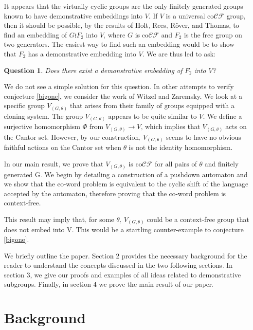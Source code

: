 \documentclass[11pt]{amsart}
\theoremstyle{plain}
\newtheorem{question}[theorem]{Question}
\theoremstyle{remark}
\theoremstyle{definition}
\theoremstyle{remark}
\theoremstyle{named}
\begin{document}
It appears that the virtually cyclic groups are the only finitely generated groups known to have demonstrative embeddings into $V$. If $V$ is a universal co$\mathcal{CF}$ group, then it should be possible, by the results of Holt, Rees, R\"{o}ver, and Thomas, to find an embedding of $G \wr F_2$ into $V$, where $G$ is co$\mathcal{CF}$ and $F_{2}$ is the free group on two generators. The easiest way to find such an embedding would be to show that $F_2$ has a demonstrative embedding into $V$. We are thus led to ask:

\begin{question} Does there exist a demonstrative embedding of $F_{2}$ into $V$?
\end{question}

We do not see a simple solution for this question. In other attempts to verify conjecture \ref{bigone}, we consider the work of Witzel and Zaremsky. We look at a specific group $V_{(G, \theta)}$ that arises from their family of groups equipped with a cloning system. The group $V_{(G, \theta)}$ appears to be quite similar to $V$. We define a surjective homomorphism $\Phi$ from $V_{(G, \theta)} \rightarrow V$, which implies that $V_{(G, \theta)}$ acts on the Cantor set. However, by our construction, $V_{(G, \theta)}$ seems to have no obvious faithful actions on the Cantor set when $\theta$ is not the identity homomorphism.

In our main result, we prove that $V_{(G, \theta)}$ is co$\mathcal{CF}$ for all pairs of $\theta$ and finitely generated G. We begin by detailing a construction of a pushdown automaton and we show that the co-word problem is equivalent to the cyclic shift of the language accepted by the automaton, therefore proving that the co-word problem is context-free. 

This result may imply that, for some $\theta$, $V_{(G, \theta)}$ could be a context-free group that does not embed into V. This would be a startling counter-example to conjecture \ref{bigone}. 

We briefly outline the paper. Section 2 provides the necessary background for the reader to understand the concepts discussed in the two following sections. In section 3, we give our proofs and examples of all ideas related to demonstrative subgroups. Finally, in section 4 we prove the main result of our paper. 

\section{Background}
\end{document}
